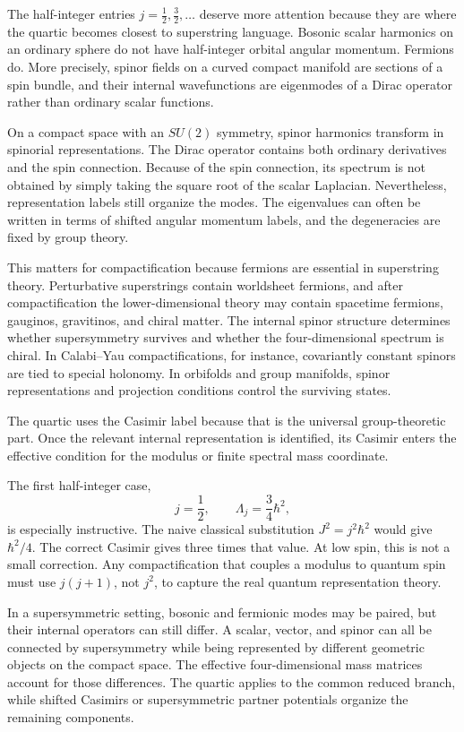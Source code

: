\documentclass[11pt]{article}
\newcommand{\Lspin}{\Lambda_j}
\newcommand{\hb}{\hbar}
\begin{document}
The half-integer entries \(j=\frac12,\frac32,\ldots\) deserve more attention because they are where the quartic becomes closest to superstring language. Bosonic scalar harmonics on an ordinary sphere do not have half-integer orbital angular momentum. Fermions do. More precisely, spinor fields on a curved compact manifold are sections of a spin bundle, and their internal wavefunctions are eigenmodes of a Dirac operator rather than ordinary scalar functions.

On a compact space with an \(SU(2)\) symmetry, spinor harmonics transform in spinorial representations. The Dirac operator contains both ordinary derivatives and the spin connection. Because of the spin connection, its spectrum is not obtained by simply taking the square root of the scalar Laplacian. Nevertheless, representation labels still organize the modes. The eigenvalues can often be written in terms of shifted angular momentum labels, and the degeneracies are fixed by group theory.

This matters for compactification because fermions are essential in superstring theory. Perturbative superstrings contain worldsheet fermions, and after compactification the lower-dimensional theory may contain spacetime fermions, gauginos, gravitinos, and chiral matter. The internal spinor structure determines whether supersymmetry survives and whether the four-dimensional spectrum is chiral. In Calabi--Yau compactifications, for instance, covariantly constant spinors are tied to special holonomy. In orbifolds and group manifolds, spinor representations and projection conditions control the surviving states.

The quartic uses the Casimir label because that is the universal group-theoretic part. Once the relevant internal representation is identified, its Casimir enters the effective condition for the modulus or finite spectral mass coordinate.

The first half-integer case,
\[
        j=\frac12,\qquad \Lspin=\frac34\hb^2,
\]
is especially instructive. The naive classical substitution \(J^2=j^2\hb^2\) would give \(\hb^2/4\). The correct Casimir gives three times that value. At low spin, this is not a small correction. Any compactification that couples a modulus to quantum spin must use \(j(j+1)\), not \(j^2\), to capture the real quantum representation theory.

In a supersymmetric setting, bosonic and fermionic modes may be paired, but their internal operators can still differ. A scalar, vector, and spinor can all be connected by supersymmetry while being represented by different geometric objects on the compact space. The effective four-dimensional mass matrices account for those differences. The quartic applies to the common reduced branch, while shifted Casimirs or supersymmetric partner potentials organize the remaining components.
\end{document}
